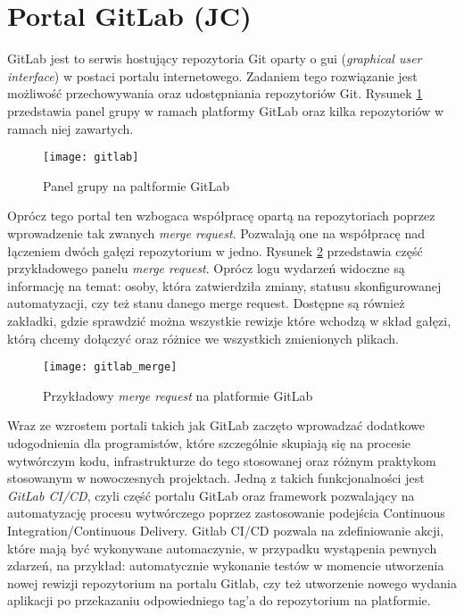 \section{Portal GitLab (JC)}

GitLab jest to serwis hostujący repozytoria Git oparty o gui (\emph{graphical user interface}) w postaci portalu internetowego. Zadaniem tego rozwiązanie jest możliwość przechowywania oraz udostępniania repozytoriów Git. Rysunek \ref{fig:gitlab} przedstawia panel grupy w ramach platformy GitLab oraz kilka repozytoriów w ramach niej zawartych.

\begin{figure}[H]
    \centering
    \texttt{[image: gitlab]}
    \caption{Panel grupy na paltformie GitLab}
    \label{fig:gitlab}
\end{figure}

Oprócz tego portal ten wzbogaca współpracę opartą na repozytoriach poprzez wprowadzenie tak zwanych \emph{merge request}. Pozwalają one na współpracę nad łączeniem dwóch gałęzi repozytorium w jedno. Rysunek \ref{fig:merge} przedstawia część przykładowego panelu \emph{merge request}. Oprócz logu wydarzeń widoczne są informację na temat: osoby, która zatwierdziła zmiany, statusu skonfigurowanej automatyzacji, czy też stanu danego merge request. Dostępne są również zakładki, gdzie sprawdzić można wszystkie rewizje które wchodzą w skład gałęzi, którą chcemy dołączyć oraz różnice we wszystkich zmienionych plikach.

\begin{figure}[H]
    \centering
    \texttt{[image: gitlab\_merge]}
    \caption{Przykładowy \emph{merge request} na platformie GitLab}
    \label{fig:merge}
\end{figure}

Wraz ze wzrostem portali takich jak GitLab zaczęto wprowadzać dodatkowe udogodnienia dla programistów, które szczególnie skupiają się na procesie wytwórczym kodu, infrastrukturze do tego stosowanej oraz różnym praktykom stosowanym w nowoczesnych projektach. Jedną z takich funkcjonalności jest \emph{GitLab CI/CD}, czyli część portalu GitLab oraz framework pozwalający na automatyzację procesu wytwórczego poprzez zastosowanie podejścia Continuous Integration/Continuous Delivery. Gitlab CI/CD pozwala na zdefiniowanie akcji, które mają być wykonywane automaczynie, w przypadku wystąpenia pewnych zdarzeń, na przykład: automatycznie wykonanie testów w momencie utworzenia nowej rewizji repozytorium na portalu Gitlab, czy też utworzenie nowego wydania aplikacji po przekazaniu odpowiedniego tag'a do repozytorium na platformie.

